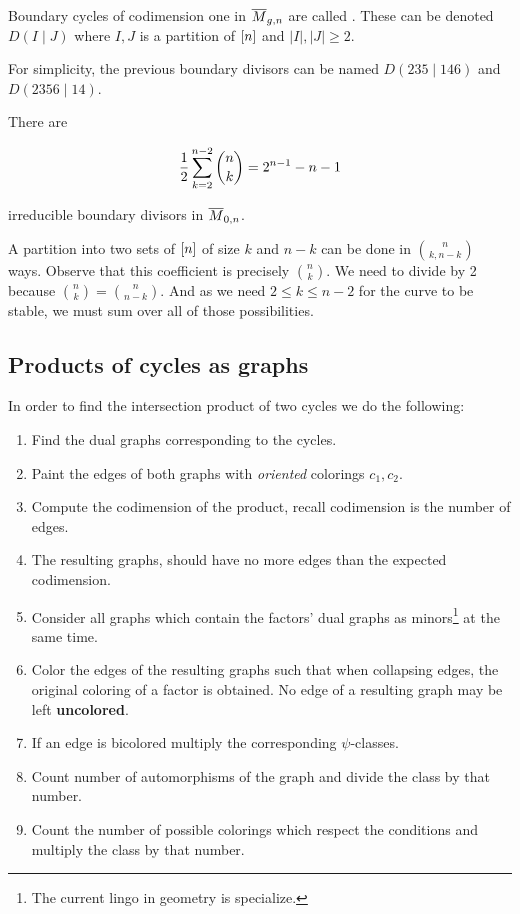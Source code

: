 \documentclass[12pt]{memoir}
\begin{document}
\begin{Def}
    Boundary cycles of codimension one in \(\overline M_{g,n}\) are called . These can be denoted \(D(I\mid J)\) where \(I,J\) is a partition of \(\left\lbrack n\right\rbrack\) and \(|I|,|J|\geq 2\).
\end{Def}

\begin{Ex}
    For simplicity, the previous boundary divisors can be named \(D(235\mid 146)\) and \(D(2356\mid 14)\).
\end{Ex}

\begin{Prop}
    There are

    \[\half\sum_{k=2}^{n-2}\binom{n}{k}=2^{n-1}-n-1\]

    irreducible boundary divisors in \(\overline M_{0,n}\).
\end{Prop}

\begin{ptcbp}
    A partition into two sets of \(\left\lbrack n\right\rbrack\) of size \(k\) and \(n-k\) can be done in \(\binom{n}{k,n-k}\) ways. Observe that this coefficient is precisely \(\binom{n}{k}\). We need to divide by 2 because \(\binom{n}{k}=\binom{n}{n-k}\). And as we need \(2\leq k\leq n-2\) for the curve to be stable, we must sum over all of those possibilities.
\end{ptcbp}

\subsection{Products of cycles as graphs}

In order to find the intersection product of two cycles we do the following:

\begin{enumerate}
    \item Find the dual graphs corresponding to the cycles.
    \item Paint the edges of both graphs with \emph{oriented} colorings \(c_1,c_2\).
    \item Compute the codimension of the product, recall codimension is the number of edges.
    \item The resulting graphs, should have no more edges than the expected codimension.
    \item Consider all graphs which contain the factors' dual graphs as minors\footnote{The current lingo in geometry is specialize.} at the same time.
    \item Color the edges of the resulting graphs such that when collapsing edges, the original coloring of a factor is obtained. No edge of a resulting graph may be left \textbf{uncolored}.
    \item If an edge is bicolored multiply the corresponding \(\psi\)-classes.
    \item Count number of automorphisms of the graph and divide the class by that number.
    \item Count the number of possible colorings which respect the conditions and multiply the class by that number.
\end{enumerate}
\end{document}
